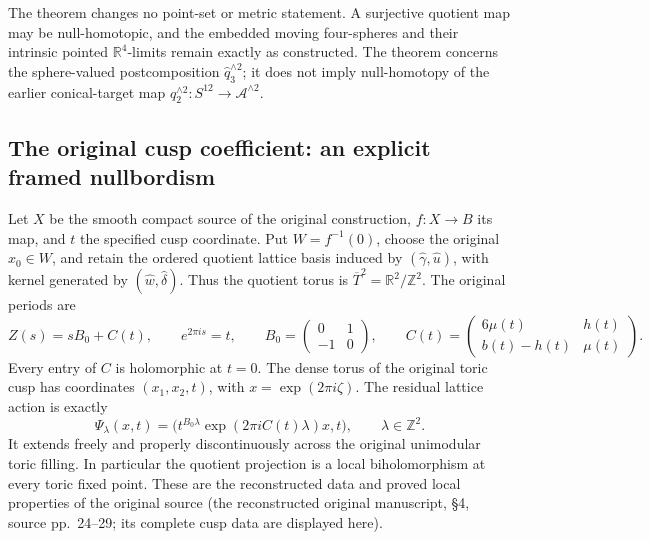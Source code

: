\begin{remark}[Scope]
\label{cusp-s12-nullity-scope}
The theorem changes no point-set or metric statement.  A surjective quotient
map may be null-homotopic, and the embedded moving four-spheres and their
intrinsic pointed \(\mathbb R^4\)-limits remain exactly as constructed.  The
theorem concerns the sphere-valued postcomposition
\(\widehat q_3^{\wedge2}\); it does not imply null-homotopy of the earlier
conical-target map
\(q_2^{\wedge2}:S^{12}\to\mathcal A^{\wedge2}\).
\end{remark}

\subsection{The original cusp coefficient: an explicit framed nullbordism}


Let \(X\) be the smooth compact source of the original construction,
\(f:X\to B\) its map, and \(t\) the specified cusp coordinate.
Put \(W=f^{-1}(0)\), choose the original \(x_0\in W\), and retain the
ordered quotient lattice basis induced by
\((\widehat\gamma,\widehat u)\), with kernel generated by
\((\widehat w,\widehat\delta)\). Thus the quotient torus is
\(\overline T^2=\mathbb R^2/\mathbb Z^2\). The original periods are
\begin{equation}
 Z(s)=sB_0+C(t),\qquad e^{2\pi i s}=t,\qquad
 B_0=\begin{pmatrix}0&1\\-1&0\end{pmatrix},\qquad
 C(t)=\begin{pmatrix}6\mu(t)&h(t)\\b(t)-h(t)&\mu(t)\end{pmatrix}.
 \label{cusp-null:eq:periods}
\end{equation}
Every entry of \(C\) is holomorphic at \(t=0\).
The dense torus of the original toric cusp has coordinates
\((x_1,x_2,t)\), with
\(x=\exp(2\pi i\zeta)\). The residual lattice action is exactly
\begin{equation}
 \Psi_\lambda(x,t)=
 \bigl(t^{B_0\lambda}\exp(2\pi iC(t)\lambda)x,t\bigr),
 \qquad\lambda\in\mathbb Z^2.
 \label{cusp-null:eq:action}
\end{equation}
It extends freely and properly discontinuously across the original
unimodular toric filling. In particular the quotient projection is a local
biholomorphism at every toric fixed point. These are the reconstructed
data and proved local properties of the original source
(the reconstructed original manuscript, \S4, source pp.~24--29; its complete cusp data are displayed here).

